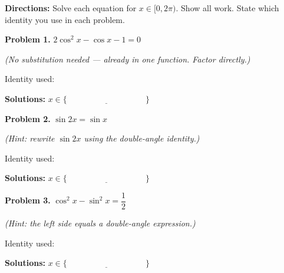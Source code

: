 \documentclass[10pt]{article}
\begin{document}
\begin{tcolorbox}[colback=white, colframe=black!40,
    title=\textbf{Tier A --- Apply},
    fonttitle=\bfseries, arc=2mm, left=3mm, right=3mm, top=2mm, bottom=2mm]

\textbf{Directions:} Solve each equation for $x \in [0, 2\pi)$. Show all work.
State which identity you use in each problem.

\vspace{8pt}
\textbf{Problem 1.} $2\cos^2 x - \cos x - 1 = 0$

\textit{(No substitution needed --- already in one function. Factor directly.)}

\vspace{4pt}
Identity used: \underline{\hspace{4cm}}


\textbf{Solutions:} $x \in \big\{ \underline{\hspace{4cm}} \big\}$

\vspace{8pt}
\textbf{Problem 2.} $\sin 2x = \sin x$

\textit{(Hint: rewrite $\sin 2x$ using the double-angle identity.)}

\vspace{4pt}
Identity used: \underline{\hspace{4cm}}


\textbf{Solutions:} $x \in \big\{ \underline{\hspace{4cm}} \big\}$

\vspace{8pt}
\textbf{Problem 3.} $\cos^2 x - \sin^2 x = \dfrac{1}{2}$

\textit{(Hint: the left side equals a double-angle expression.)}

\vspace{4pt}
Identity used: \underline{\hspace{4cm}}


\textbf{Solutions:} $x \in \big\{ \underline{\hspace{4cm}} \big\}$

\end{tcolorbox}

\vspace{0.08in}
\end{document}
